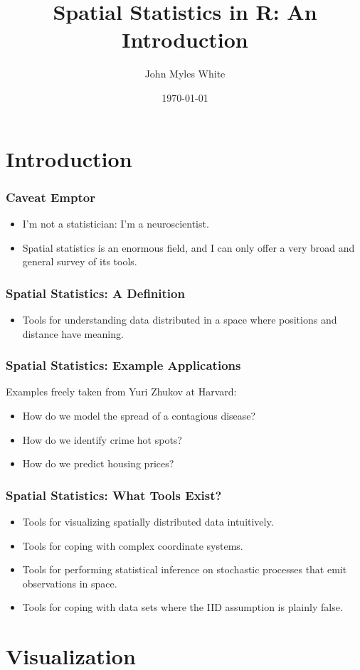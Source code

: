 \documentclass{beamer}
\title{Spatial Statistics in R: An Introduction}
\author{John Myles White}
\date{\today}
\begin{document}
\frame{\titlepage}

\section{Introduction}

\frame
{
  \frametitle{Caveat Emptor}
	
  \begin{itemize}
		\item<1->{I'm not a statistician: I'm a neuroscientist.}
		\item<2->{Spatial statistics is an enormous field, and I can only offer a very broad and general survey of its tools.}
  \end{itemize}
}

\frame
{
  \frametitle{Spatial Statistics: A Definition}
	
  \begin{itemize}
		\item<1->{Tools for understanding data distributed in a space where positions and distance have meaning.}
  \end{itemize}
}

\frame
{
  \frametitle{Spatial Statistics: Example Applications}
	Examples freely taken from Yuri Zhukov at Harvard:
	
  \begin{itemize}
		\item<1->{How do we model the spread of a contagious disease?}
		\item<2->{How do we identify crime hot spots?}
		\item<3->{How do we predict housing prices?}
  \end{itemize}
}

\frame
{
  \frametitle{Spatial Statistics: What Tools Exist?}
	
  \begin{itemize}
		\item<1->{Tools for visualizing spatially distributed data intuitively.}
		\item<2->{Tools for coping with complex coordinate systems.}
		\item<3->{Tools for performing statistical inference on stochastic processes that emit observations in space.}
		\item<4->{Tools for coping with data sets where the IID assumption is plainly false.}
  \end{itemize}
}

\section{Visualization}
\end{document}
